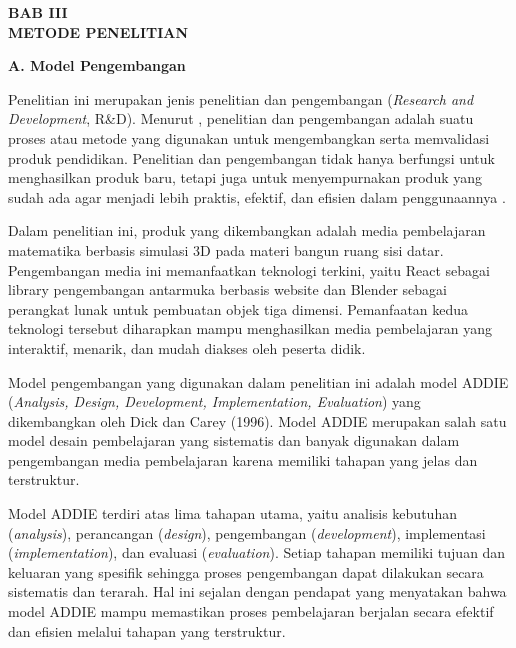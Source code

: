 \newpage
\begin{center}
    \textbf{BAB III}\\
    \textbf{METODE PENELITIAN}
\end{center}

\textbf{A. Model Pengembangan}


\hspace*{1cm}Penelitian ini merupakan jenis penelitian dan pengembangan (\textit{Research and Development}, R\&D). Menurut \cite{borg1989}, penelitian dan pengembangan adalah suatu proses atau metode yang digunakan untuk mengembangkan serta memvalidasi produk pendidikan. Penelitian dan pengembangan tidak hanya berfungsi untuk menghasilkan produk baru, tetapi juga untuk menyempurnakan produk yang sudah ada agar menjadi lebih praktis, efektif, dan efisien dalam penggunaannya \citep{sugiyono2018}.

\hspace*{1cm}Dalam penelitian ini, produk yang dikembangkan adalah media pembelajaran matematika berbasis simulasi 3D pada materi bangun ruang sisi datar. Pengembangan media ini memanfaatkan teknologi terkini, yaitu React sebagai library pengembangan antarmuka berbasis website dan Blender sebagai perangkat lunak untuk pembuatan objek tiga dimensi. Pemanfaatan kedua teknologi tersebut diharapkan mampu menghasilkan media pembelajaran yang interaktif, menarik, dan mudah diakses oleh peserta didik.

\hspace*{1cm}Model pengembangan yang digunakan dalam penelitian ini adalah model ADDIE (\textit{Analysis, Design, Development, Implementation, Evaluation}) yang dikembangkan oleh Dick dan Carey (1996). Model ADDIE merupakan salah satu model desain pembelajaran yang sistematis dan banyak digunakan dalam pengembangan media pembelajaran karena memiliki tahapan yang jelas dan terstruktur.

\hspace*{1cm}Model ADDIE terdiri atas lima tahapan utama, yaitu analisis kebutuhan (\textit{analysis}), perancangan (\textit{design}), pengembangan (\textit{development}), implementasi (\textit{implementation}), dan evaluasi (\textit{evaluation}). Setiap tahapan memiliki tujuan dan keluaran yang spesifik sehingga proses pengembangan dapat dilakukan secara sistematis dan terarah. Hal ini sejalan dengan pendapat \cite{gustiani2019} yang menyatakan bahwa model ADDIE mampu memastikan proses pembelajaran berjalan secara efektif dan efisien melalui tahapan yang terstruktur.

